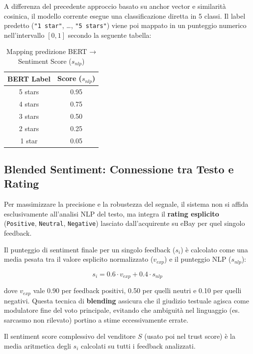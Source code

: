 A differenza del precedente approccio basato su anchor vector e similarità
cosinica, il modello corrente esegue una classificazione diretta in 5 classi.
Il label predetto (\texttt{"1 star"}, \dots, \texttt{"5 stars"}) viene poi
mappato in un punteggio numerico nell'intervallo $[0, 1]$ secondo la seguente
tabella:

\begin{table}[htbp]
\centering
\caption{Mapping predizione BERT → Sentiment Score ($s_{nlp}$)}
\label{tab:bert-score-map}
\begin{tabular}{cc}
\hline
\textbf{BERT Label} & \textbf{Score ($s_{nlp}$)} \\
\hline
5 stars & 0.95 \\
4 stars & 0.75 \\
3 stars & 0.50 \\
2 stars & 0.25 \\
1 star  & 0.05 \\
\hline
\end{tabular}
\end{table}

\subsection{Blended Sentiment: Connessione tra Testo e Rating}
\label{subsec:sentiment-blending}

Per massimizzare la precisione e la robustezza del segnale, il sistema non si
affida esclusivamente all'analisi NLP del testo, ma integra il \textbf{rating
esplicito} (\texttt{Positive}, \texttt{Neutral}, \texttt{Negative}) lasciato
dall'acquirente su eBay per quel singolo feedback.

Il punteggio di sentiment finale per un singolo feedback ($s_i$) è calcolato
come una media pesata tra il valore esplicito normalizzato ($v_{exp}$) e
il punteggio NLP ($s_{nlp}$):

\[
    s_i = 0.6 \cdot v_{exp} + 0.4 \cdot s_{nlp}
\]

dove $v_{exp}$ vale 0.90 per feedback positivi, 0.50 per quelli neutri e 0.10
per quelli negativi. Questa tecnica di \textbf{blending} assicura che il
giudizio testuale agisca come modulatore fine del voto principale, evitando
che ambiguità nel linguaggio (es. sarcasmo non rilevato) portino a stime
eccessivamente errate.

Il sentiment score complessivo del venditore $S$ (usato poi nel trust score)
è la media aritmetica degli $s_i$ calcolati su tutti i feedback analizzati.

